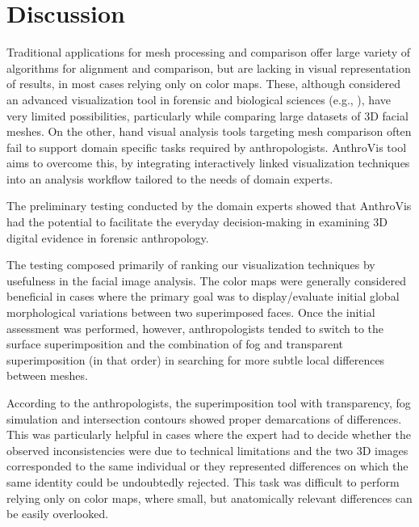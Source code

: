 \documentclass[final,5p,times]{elsarticle}
\begin{document}
\section{Discussion} \label{discussion}
{\color{red}Traditional applications for mesh processing and comparison offer large variety of algorithms for alignment and comparison, but are lacking in visual representation of results, in most cases relying only on color maps.
These, although considered an advanced visualization tool in forensic and biological sciences (e.g., \cite{urbanova2015testing}), have very limited possibilities, particularly while comparing large datasets of 3D facial meshes.
On the other, hand visual analysis tools targeting mesh comparison often fail to support domain specific tasks required by anthropologists.
AnthroVis tool aims to overcome this, by integrating interactively linked visualization techniques into an analysis workflow tailored to the needs of domain experts.
}

The preliminary testing conducted by the domain experts showed that  AnthroVis had the potential to facilitate the everyday decision-making in examining 3D digital evidence in forensic anthropology.

The testing composed primarily of ranking our visualization techniques by usefulness in the facial image analysis. 
The color maps were generally considered beneficial in cases where the primary goal was to display/evaluate initial global morphological variations between two superimposed faces. 
Once the initial assessment was performed, however, anthropologists tended to switch to the surface superimposition and the combination of fog and transparent superimposition (in that order) in searching for more subtle local differences between meshes. 

\begin{sloppypar}
According to the anthropologists, the superimposition tool with transparency, fog simulation and intersection contours showed proper demarcations of differences. This was particularly helpful in cases where the expert had to decide whether the observed inconsistencies were due to technical limitations and the two 3D images corresponded to the same individual or they represented differences on which the same identity could be undoubtedly rejected. {\color{red}This task was difficult to perform relying only on color maps, where small, but anatomically relevant differences can be easily overlooked.}
\end{sloppypar}
 
\end{document}
